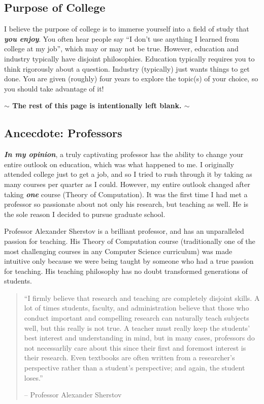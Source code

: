 \documentclass[11pt]{article}
\newenvironment{example}{
\begin{tcolorbox}[title=Example, colback=blue!5!white, colframe=black!75!blue]
}{ \end{tcolorbox} }
\renewcommand{\bf}[1]{\textbf{{#1}}}
\newcommand{\ib}[1]{\textit{\textbf{{#1}}}}
\begin{document}
\subsection{Purpose of College}
I believe the purpose of college is to immerse yourself into a field of study
that \ib{you enjoy}. You often hear people say ``I don't use anything I learned
from college at my job'', which may or may not be true. However, education and
industry typically have disjoint philosophies. Education typically requires you
to think rigorously about a question. Industry (typically) just wants things to
get done. You are given (roughly) four years to explore the topic(s) of your
choice, so you should take advantage of it!
\begin{center}
  \vspace{5em}
  \bf{$\bm{\sim}$ The rest of this page is intentionally left blank. $\bm{\sim}$}
\end{center}

\newpage
\subsection{Ancecdote: Professors}
\ib{In my opinion}, a truly captivating professor has the ability to change your
entire outlook on education, which was what happened to me. I originally
attended college just to get a job, and so I tried to rush through it by taking
as many courses per quarter as I could. However, my entire outlook changed after
taking \ib{one} course (Theory of Computation). It was the first time I had met
a professor so passionate about not only his research, but teaching as well. He
is the sole reason I decided to pursue graduate school.
\begin{example}
  Professor Alexander Sherstov is a brilliant professor, and has an unparalleled
  passion for teaching. His Theory of Computation course (traditionally one of the
  most challenging courses in any Computer Science curriculum) was made intuitive
  only because we were being taught by someone who had a true passion for
  teaching. His teaching philosophy has no doubt transformed generations of
  students.
  \begin{quote}
    ``I firmly believe that research and teaching are completely disjoint
    skills. A lot of times students, faculty, and administration believe that
    those who conduct important and compelling research can naturally teach
    subjects well, but this really is not true. A teacher must really keep the
    students' best interest and understanding in mind, but in many cases,
    professors do not necessarlily care about this since their first and
    foremost interest is their research. Even textbooks are often written from a
    researcher's perspective rather than a student's perspective; and again, the
    student loses.''
    \vspace{-1em}
    \begin{flushright}
      -- Professor Alexander Sherstov
    \end{flushright}
  \end{quote}
\end{example}
\end{document}
